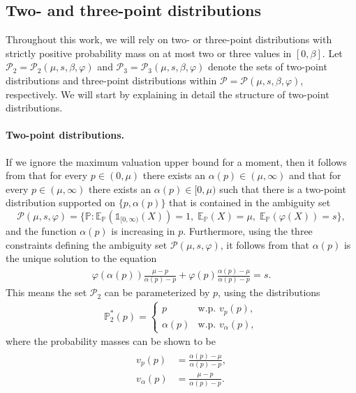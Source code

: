 \documentclass[11pt]{article}
\renewcommand{\P}{\mathbb{P}}
\newcommand{\E}{\mathbb{E}}
\newcommand{\Prob}{\mathbb{P}}
\newcommand{\bP}{\mathbb{P}}
\newcommand{\cP}{\mathcal{P}}
\newcommand{\cPpar}{\mathcal{P}(\mu,s,\beta,\varphi)}
\newcommand{\1}{\mathds{1}}
\begin{document}
\subsection{Two- and three-point distributions}\label{sec23points}
{Throughout this work, we will rely on two- or three-point distributions with strictly positive probability mass on at most two or three values in $[0,\beta]$.} Let $\cP_2 = \mathcal{P}_2(\mu,s,\beta,\varphi)$ and $\cP_3 = \mathcal{P}_3(\mu,s,\beta,\varphi)$ denote the sets of two-point distributions and three-point distributions within 
$\cP = \cPpar$, respectively. We will start by explaining in detail the structure of two-point distributions.

\paragraph{Two-point distributions.} If we ignore the maximum valuation upper bound for a moment, then it follows from \cite[Proposition 2.3]{kleer2024distribution} that for every $p \in (0,\mu)$ there exists an $\alpha(p) \in (\mu,\infty)$ and that for every $p \in (\mu,\infty)$ there exists an $\alpha(p) \in [0,\mu)$ such that there is a two-point distribution supported on $\{p,\alpha(p)\}$ that is contained in the ambiguity set 
$$
\mathcal{P}(\mu,s,\varphi) = \{\Prob :  \E_{\P}(\1_{[0,\infty)}(X)) = 1,\; \E_{\P}(X) = \mu,\; \E_{\P}(\varphi(X)) = s\},
$$
and the function $\alpha(p)$ is increasing in $p$. Furthermore, using the three constraints defining the ambiguity set $\mathcal{P}(\mu,s,\varphi)$, it follows from \cite[Proposition 2.2]{kleer2024distribution} that $\alpha(p)$ is the unique solution to the equation
\begin{align}\label{alpha}
    \varphi(\alpha(p))\frac{\mu-p}{\alpha(p)-p}+\varphi(p)\frac{\alpha(p)-\mu}{\alpha(p)-p}=s.
\end{align}
This means the set $\cP_2$ can be parameterized by $p$, using the distributions 
\begin{align}\label{P^*_2}
    \bP^*_2(p) = \left\{ \begin{array}{ll}
        p & \text{w.p. } v_p(p), \\
        \alpha(p) & \text{w.p. } v_{\alpha}(p),
    \end{array}\right.
\end{align}
where the probability masses can be shown to be
\begin{align}
\begin{array}{ll}
 v_p(p) & = \displaystyle \frac{\alpha(p)-\mu}{\alpha(p)-p},\\[3.5ex] 
        v_{\alpha}(p) & = \displaystyle  \frac{\mu-p}{\alpha(p)-p}.
\end{array}
\label{eq:two_point_masses} 
\end{align}
\end{document}
